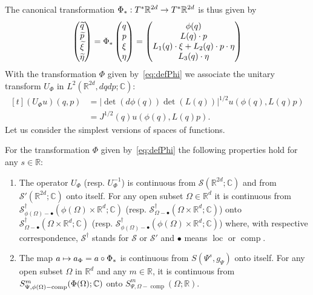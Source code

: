 \documentclass[10pt]{amsart}
\theoremstyle{definition}\newtheorem{defi}[theo]{Definition}\newtheorem{rema}[theo]{Remark}\newtheorem{exam}[theo]{Example}\newtheorem{exem}[theo]{Example}\newtheorem{nota}[theo]{Notation}
\newcommand{\C}{\mathbb{C}}
\newcommand{\R}{\mathbb{R}}
\newcommand{\clS}{\mathcal{S}}
\newcommand{\p}{\partial}
\DeclareMathOperator{\ccomp}{comp}
\DeclareMathOperator{\locc}{loc}
\newcommand*{\relabel}{\renewcommand{\labelenumi}{(\theenumi)}}
\newcommand*{\romanenumi}{\renewcommand*{\theenumi}{\roman{enumi}}\relabel}
\let\oldtilde\tilde
\renewcommand*{\tilde}[1]{\mathchoice{\widetilde{#1}}{\widetilde{#1}}{\oldtilde{#1}}{\oldtilde{#1}}}
\renewcommand*{\to}{\mathchoice{\longrightarrow}{\rightarrow}{\rightarrow}{\rightarrow}}
\let\oldmapsto\mapsto
\renewcommand*{\mapsto}{\mathchoice{\longmapsto}{\oldmapsto}{\oldmapsto}{\oldmapsto}}
\begin{document}
The canonical transformation $\Phi_{*}:T^{*}\R^{2d}\to T^{*}\R^{2d}$ is thus given by
\[
\begin{pmatrix}
\tilde{q}\\
\tilde{p}\\
\tilde{\xi}\\
\tilde{\eta}
\end{pmatrix} =\Phi_{*}
\begin{pmatrix}
q\\p\\\xi\\\eta
\end{pmatrix} =
\begin{pmatrix}
\phi(q)\\
L(q)\cdot p\\
L_{1}(q)\cdot\xi+L_{2}(q)\cdot p\cdot\eta\\
L_{3}(q)\cdot\eta
\end{pmatrix}
\]
With the transformation $\Phi$ given by~\eqref{eq:defPhi} we associate the unitary transform $U_{\Phi}$ in $L^{2}(\R^{2d},dqdp;\C)$:
\begin{equation}\label{eq:defUPsi}
\begin{aligned}[t]
(U_{\Phi}u)(q,p)&=\lvert\det(d\phi(q))\det(L(q))|^{1/2}u(\phi(q),L(q)p)\\
&=J^{1/2}(q)u(\phi(q),L(q)p).
\end{aligned}
\end{equation}
Let us consider the simplest versions of spaces of functions.
\begin{prop}\label{pr:invfunc}
For the transformation $\Phi$ given by~\eqref{eq:defPhi} the following properties hold for any $s\in \R$:
\begin{enumerate}\romanenumi
\item\label{propE.12.1} The operator $U_{\Phi}$ (resp. $U_{\Phi}^{-1}$) is continuous from $\clS(\R^{2d};\C)$ and from\linebreak $\clS'(\R^{2d};\C)$ onto itself. For any open subset $\Omega\in \R^{d}$ it is continuous from $\clS^{\dagger}_{\phi(\Omega)-\bullet}(\phi(\Omega)\times \R^{d};\C)$ (resp. $\clS^{\dagger}_{\Omega-\bullet}(\Omega\times \R^{d};\C)$) onto $\clS^{\dagger}_{\Omega-\bullet}(\Omega\times \R^{d};\C)$ (resp. $\clS^{\dagger}_{\phi(\Omega)-\bullet}(\phi(\Omega)\times \R^{d};\C)$) where, with respective correspondence, $\clS^{\dagger}$ stands for $\clS$ or $\clS'$ and ${\bullet}$ means $\locc$ or $\ccomp$.
\item\label{propE.12.2} The map $a\mapsto a_{\Phi}=a\circ \Phi_{*}$ is continuous from $S(\Psi^{s},g_{\Psi})$ onto itself. For any open subset $\Omega$ in $\R^{d}$ and any $m\in \R$, it is continuous from $S^{m}_{\Psi,\phi(\Omega)-\ccomp}(\Phi(\Omega);\linebreak\C)$ onto $S^{m}_{\Psi,\Omega-\ccomp}(\Omega;\R)$.
\end{enumerate}
\end{prop}
\end{document}
